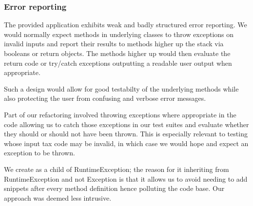 \subsubsection{Error reporting}
\label{sec:error-reporting}
The provided application exhibits weak and badly structured error reporting. We would normally expect methods in underlying classes to throw exceptions on invalid inputs and report their results to methods higher up the stack via booleans or return objects. The methods higher up would then evaluate the return code or try/catch exceptions outputting a readable user output when appropriate.
\par
Such a design would allow for good testabilty of the underlying methods while also protecting the user from confusing and verbose error messages. 
\par 
Part of our refactoring involved throwing exceptions where appropriate in the code allowing us to catch those exceptions in our test suites and evaluate whether they should or should not have been thrown. 
This is especially relevant to testing  whose input tax code may be invalid, in which case we would hope and expect an exception to be thrown. 
\par 
We create  as a child of RuntimeException; the reason for it inheriting from RuntimeException and not Exception is that it allows us to avoid needing to add snippets  after every method definition hence polluting the code base. 
Our approach was deemed less intrusive. 



% 

